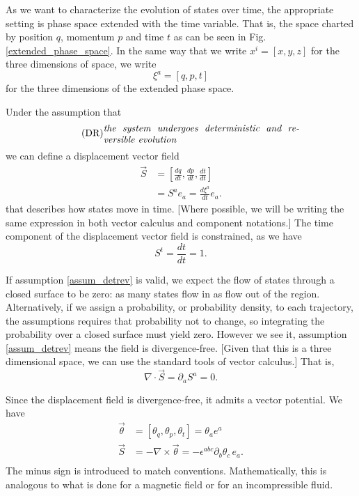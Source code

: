 \documentclass[fleqn,10pt]{wlscirep}
\begin{document}
As we want to characterize the evolution of states over time, the appropriate setting is phase space extended with the time variable\cite{lanczos1949variational,synge1960encyclopedia}. That is, the space charted by position $q$, momentum $p$ and time $t$ as can be seen in Fig. \ref{extended_phase_space}. In the same way that we write $x^i = [ x, y, z ]$ for the three dimensions of space, we write
\begin{equation}\label{sdof_variables}
	\xi^a = [ q, p, t]
\end{equation}
for the three dimensions of the extended phase space.

Under the assumption that
\begin{align}\label{assum_detrev}
	\tag*{(DR)}
	\parbox{2.8in}{\emph{the system undergoes deterministic and reversible evolution}}
\end{align}
we can define a displacement vector field
\begin{equation}\label{sdof_displacement}
\begin{aligned}
	\vec{S} &= \left[ \frac{dq}{dt},\frac{dp}{dt},\frac{dt}{dt} \right] \\
	&= S^a e_a = \frac{d\xi^a}{dt} e_a .
\end{aligned}
\end{equation}
that describes how states move in time. [Where possible, we will be writing the same expression in both vector calculus and component notations.] The time component of the displacement vector field is constrained, as we have
\begin{equation}\label{sdof_time_constraint}
	S^t=\frac{dt}{dt}=1.
\end{equation}

If assumption \ref{assum_detrev} is valid, we expect the flow of states through a closed surface to be zero: as many states flow in as flow out of the region. Alternatively, if we assign a probability, or probability density, to each trajectory, the assumptions requires that probability not to change, so integrating the probability over a closed surface must yield zero. However we see it, assumption \ref{assum_detrev} means the field is divergence-free.  [Given that this is a three dimensional space, we can use the standard tools of vector calculus.] That is, 
\begin{equation}\label{sdof_div_free}
	\nabla \cdot \vec{S} = \partial_a S^a = 0.
\end{equation}

 Since the displacement field is divergence-free, it admits a vector potential. We have
\begin{equation}\label{sdof_displacement_potential}
\begin{aligned}
	\vec{\theta} &= [\theta_q, \theta_p, \theta_t] = \theta_a e^a \\
	\vec{S} &= - \nabla \times \vec{\theta} = - \epsilon^{abc} \partial_b \theta_c \, e_a. \\
\end{aligned}
\end{equation}
The minus sign is introduced to match conventions. Mathematically, this is analogous to what is done for a magnetic field or for an incompressible fluid.
\end{document}
